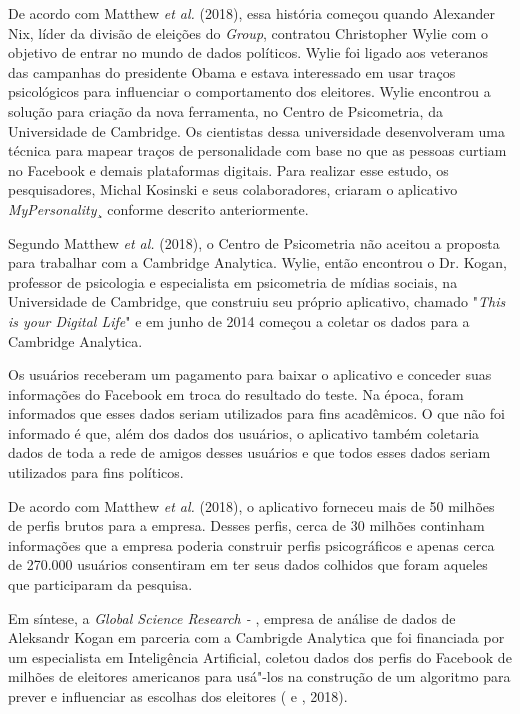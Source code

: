 De acordo com Matthew \emph{et al.} (2018), essa história começou quando
Alexander Nix, líder da divisão de eleições do \emph{ Group},
contratou Christopher Wylie com o objetivo de entrar no mundo de dados
políticos. Wylie foi ligado aos veteranos das campanhas do presidente
Obama e estava interessado em usar traços psicológicos para influenciar
o comportamento dos eleitores. Wylie encontrou a solução para criação da
nova ferramenta, no Centro de Psicometria, da Universidade de Cambridge.
Os cientistas dessa universidade desenvolveram uma técnica para mapear
traços de personalidade com base no que as pessoas curtiam no Facebook e
demais plataformas digitais. Para realizar esse estudo, os
pesquisadores, Michal Kosinski e seus colaboradores, criaram o
aplicativo \emph{MyPersonality}¸ conforme descrito anteriormente.

Segundo Matthew \emph{et al.} (2018), o Centro de Psicometria não aceitou a
proposta para trabalhar com a Cambridge Analytica. Wylie, então
encontrou o Dr. Kogan, professor de psicologia e especialista em
psicometria de mídias sociais, na Universidade de Cambridge, que
construiu seu próprio aplicativo, chamado "\emph{This is your Digital
Life}" e em junho de 2014 começou a coletar os dados para a Cambridge
Analytica.

Os usuários receberam um pagamento para baixar o aplicativo e conceder
suas informações do Facebook em troca do resultado do teste. Na época,
foram informados que esses dados seriam utilizados para fins acadêmicos.
O que não foi informado é que, além dos dados dos usuários, o aplicativo
também coletaria dados de toda a rede de amigos desses usuários e que
todos esses dados seriam utilizados para fins políticos.

De acordo com Matthew \emph{et al.} (2018), o aplicativo forneceu mais de 50
milhões de perfis brutos para a empresa. Desses perfis, cerca de 30
milhões continham informações que a empresa poderia construir perfis
psicográficos e apenas cerca de 270.000 usuários consentiram em ter seus
dados colhidos que foram aqueles que participaram da pesquisa.

Em síntese, a \emph{Global Science Research - }, empresa de análise
de dados de Aleksandr Kogan em parceria com a Cambrigde Analytica que
foi financiada por um especialista em Inteligência Artificial, coletou
dados dos perfis do Facebook de milhões de eleitores americanos para
usá"-los na construção de um algoritmo para prever e influenciar as
escolhas dos eleitores ( e , 2018).

